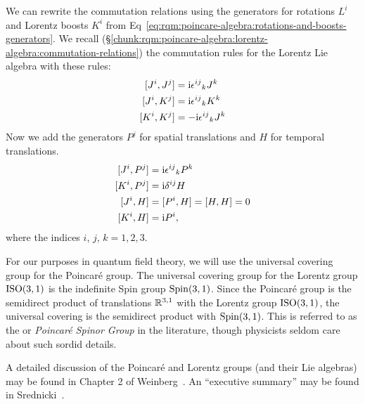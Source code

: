 \M
We can rewrite the commutation relations using the generators for
rotations $L^{i}$ and Lorentz boosts $K^{i}$ from
Eq~\eqref{eq:rqm:poincare-algebra:rotations-and-boosts-generators}.
We recall
(\S\ref{chunk:rqm:poincare-algebra:lorentz-algebra:commutation-relations})
the commutation rules for the Lorentz Lie algebra with these rules:
\begin{subequations}
\begin{align}
[J^{i}, J^{j}] &= \mathrm{i}{\epsilon^{ij}}_{k}J^{k}\\
[J^{i}, K^{j}] &= \mathrm{i}{\epsilon^{ij}}_{k}K^{k}\\
[K^{i}, K^{j}] &= -\mathrm{i}{\epsilon^{ij}}_{k}J^{k}
\end{align}
\end{subequations}
Now we add the generators $P^{j}$ for spatial translations and $H$ for
temporal translations.
\begin{subequations}
\begin{align}
[J^{i}, P^{j}] &= \mathrm{i}{\epsilon^{ij}}_{k}P^{k}\\
[K^{i}, P^{j}] &= \mathrm{i}\delta^{ij}H\\
[J^{i}, H] &= [P^{i}, H] = [H, H] = 0\\
[K^{i}, H] &= \mathrm{i} P^{i},
\end{align}
\end{subequations}
where the indices $i$, $j$, $k=1,2,3$.

\begin{ddanger}
For our purposes in quantum field theory, we will use the universal
covering group for the Poincar\'e group. The universal covering group
for the Lorentz group $\mathrm{ISO}(3,1)$ is the indefinite Spin group $\operatorname{Spin}(3,1)$.
Since the Poincar\'e group is the semidirect product of translations
$\mathbb{R}^{3,1}$ with the Lorentz group $\mathrm{ISO}(3,1)$, the universal covering
is the semidirect product with $\operatorname{Spin}(3,1)$. This is referred to as the
 or
\emph{Poincar\'e Spinor Group} in the literature, though physicists
seldom care about such sordid details. 
\end{ddanger}

A detailed discussion of the Poincar\'e and Lorentz groups (and their
Lie algebras) may be found in Chapter 2 of
Weinberg~\cite{Weinberg:1995mt}.
An ``executive summary'' may be found in Srednicki~\cite{Srednicki:2007qs}.

